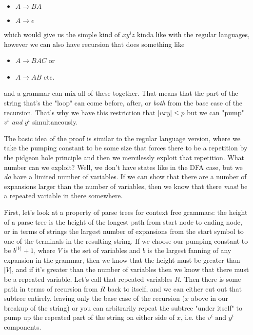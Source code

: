 \documentclass[11pt]{article}
\begin{document}
\begin{itemize}
\item $A \to BA$
\item $A \to \epsilon$
\end{itemize}
which would give us the simple kind of $xy^iz$ kinda like with the regular languages, however we can also have recursion that does something like

\begin{itemize}
\item $A \to BAC$ or
\item $A \to AB$ etc.
\end{itemize}

and a grammar can mix all of these together. That means that the part of the string that's the "loop" can come before, after, or \emph{both} from the base case of the recursion. That's why we have this restriction that $|vxy| \le p$ but we can "pump" $v^i$ \emph{and} $y^i$ simultaneously. 

The basic idea of the proof is similar to the regular language version, where we take the pumping constant to be some size that forces there to be a repetition by the pidgeon hole principle and then we mercilessly exploit that repetition. What number can we exploit? Well, we don't have states like in the DFA case, but we \emph{do} have a limited number of variables. If we can show that there are a number of expansions larger than the number of variables, then we know that there \emph{must} be a repeated variable in there somewhere. 

First, let's look at a property of parse trees for context free grammars: the height of a parse tree is the height of the longest path from start node to ending node, or in terms of strings the largest number of expansions from the start symbol to one of the terminals in the resulting string. If we choose our pumping constant to be $b^{|V|} + 1$, where $V$ is the set of variables and $b$ is the largest fanning of any expansion in the grammar, then we know that the height must be greater than $|V|$, and if it's greater than the number of variables then we know that there must be a repeated variable. Let's call that repeated variables $R$. Then there is some path in terms of recursion from $R$ back to itself, and we can either cut out that subtree entirely, leaving only the base case of the recursion ($x$ above in our breakup of the string) or you can arbitrarily repeat the subtree "under itself" to pump up the repeated part of the string on either side of $x$, i.e. the $v^i$ and $y^i$ components. 
\end{document}
